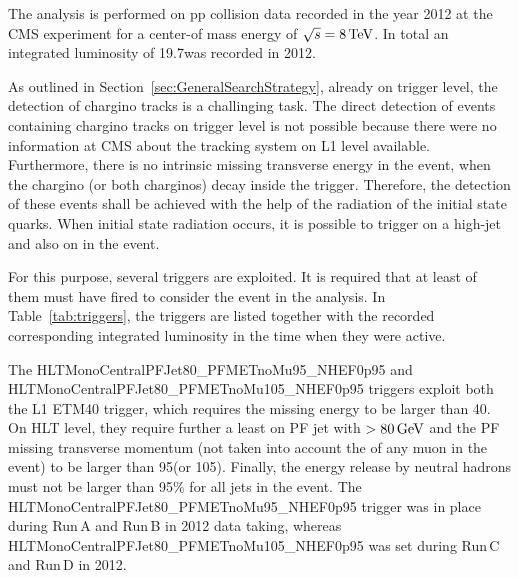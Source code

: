 The analysis is performed on pp collision data recorded in the year 2012 at the CMS experiment for a center-of mass energy of $\sqrt{s}=8\,\text{Te}\kern-0.06667em\text{V}$.
In total an integrated luminosity of 19.7\fbinv was recorded in 2012.

As outlined in Section~\ref{sec:GeneralSearchStrategy}, already on trigger level, the detection of chargino tracks is a challinging task.
The direct detection of events containing chargino tracks on trigger level is not possible because there were no information at CMS about the tracking system on L1 level available.
Furthermore, there is no intrinsic missing transverse energy in the event, when the chargino (or both charginos) decay inside the trigger.
Therefore, the detection of these events shall be achieved with the help of the radiation of the initial state quarks.
When initial state radiation occurs, it is possible to trigger on a high-\pt jet and also on \met in the event.

For this purpose, several triggers are exploited.
It is required that at least of them must have fired to consider the event in the analysis.
In Table~\ref{tab:triggers}, the triggers are listed together with the recorded corresponding integrated luminosity  in the time when they were active.
\renewcommand{\arraystretch}{1.5}
\begin{table}[!h]
\centering
\caption{\met and \met+jet triggers used in the analysis together with the recorded corresponding integrated luminosity in the time when they were in place.}
\label{tab:triggers}
\end{table}  

The HLTMonoCentralPFJet80\_PFMETnoMu95\_NHEF0p95 and HLTMonoCentralPFJet80\_PFMETnoMu105\_NHEF0p95 triggers exploit both the L1 ETM40 trigger, which requires the missing energy to be larger than 40\gev.
On HLT level, they require further a least on PF jet with \pt$>80\,\text{Ge}\kern-0.06667em\text{V}$ and the PF missing transverse momentum \met (not taken into account the \pt of any muon in the event) to be larger than 95\gev (or 105\gev).
Finally, the energy release by neutral hadrons must not be larger than 95\% for all jets in the event.
The HLTMonoCentralPFJet80\_PFMETnoMu95\_NHEF0p95 trigger was in place during Run\,A and Run\,B in 2012 data taking, whereas HLTMonoCentralPFJet80\_PFMETnoMu105\_NHEF0p95 was set during Run\,C and Run\,D in 2012.

